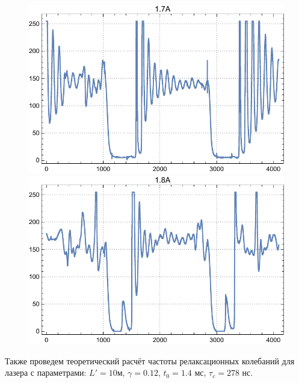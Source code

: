 \documentclass[a4paper, 12pt]{article}
\begin{document}
\begin{enumerate}
\begin{figure}[h]
			\endminipage\hfill
			\includegraphics[width=\linewidth]{1.7A.pdf}
			\endminipage\hfill
			\includegraphics[width=\linewidth]{1.8A.pdf}
			\endminipage
		\end{figure}
		\par
		Также проведем теоретический расчёт частоты релаксационных колебаний для лазера с параметрами: $L'=10$м, $\gamma=0.12$, $t_0=1.4$ мс, $\tau_c=278$ нс.
	\end{enumerate}
	\newpage
\end{document}
